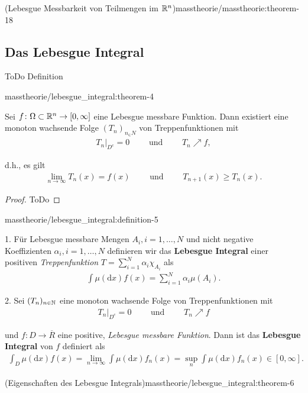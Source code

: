 \begin{theorem}{(Lebesgue Messbarkeit von Teilmengen im \protect\(\mathbb{R}^n\protect\))}{masstheorie/masstheorie:theorem-18}
\subsection{Das Lebesgue Integral}
\label{\detokenize{masstheorie/lebesgue_integral:das-lebesgue-integral}}
\par
ToDo Definition
\begin{theorem}{}{masstheorie/lebesgue_integral:theorem-4}



\par
Sei \(f \colon \Omega \subset \mathbb{R}^n \rightarrow [0,\infty]\) eine Lebesgue messbare Funktion.
Dann existiert eine monoton wachsende Folge \((T_n)_{n_\in N}\) von Treppenfunktionen mit
\begin{align*}
T_n|_{D^c} = 0 \qquad \text{ und } \qquad T_n \nearrow f,
\end{align*}
\par
d.h., es gilt
\begin{align*}
\lim_{n\rightarrow \infty} T_n(x) = f(x) \qquad \text{ und } \qquad T_{n+1}(x) \geq T_n(x).
\end{align*}\end{theorem}

\begin{proof}
 ToDo
\end{proof}
\begin{definition}{}{masstheorie/lebesgue_integral:definition-5}



\par
1. Für Lebesgue messbare Mengen \(A_i, i=1,\ldots,N\) und nicht negative Koeffizienten \(\alpha_i, i=1,\ldots,N\) definieren wir das \textbf{Lebesgue Integral} einer positiven \emph{Treppenfunktion} \(T = \sum_{i=1}^N \alpha_i \chi_{A_i}\) als
\begin{align*}
\int \mu(\mathrm{d}x) f(x) = \sum_{i=1}^N \alpha_i \mu(A_i).
\end{align*}
\par
2. Sei \((T_n)_{n\in\mathbb{N}}\) eine monoton wachsende Folge von Treppenfunktionen mit
\begin{align*}
T_n|_{D^c} = 0 \qquad \text{ und } \qquad T_n \nearrow f
\end{align*}
\par
und \(f \colon D \rightarrow \overline{R}\) eine positive, \emph{Lebesgue messbare Funktion}.
Dann ist das \textbf{Lebesgue Integral} von \(f\) definiert als
\begin{align*}
\int_D \mu(\mathrm{d}x) f(x) = \lim_{n\rightarrow \infty} \int \mu(\mathrm{d}x) f_n(x) = \sup_n \int \mu(\mathrm{d}x) f_n(x) \in [0,\infty].
\end{align*}\end{definition}
\begin{theorem}{(Eigenschaften des Lebesgue Integrals)}{masstheorie/lebesgue_integral:theorem-6}




\end{theorem}
\end{theorem}
